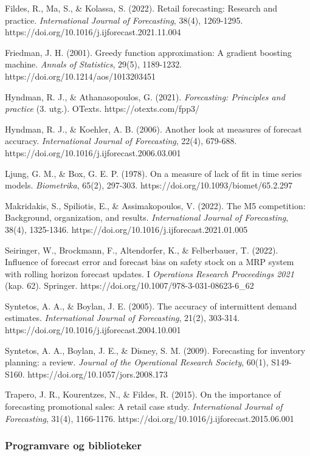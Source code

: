 \documentclass[
  norsk,
  11pt,
  a4paper,
]{article}
\begin{document}
Fildes, R., Ma, S., \& Kolassa, S. (2022). Retail forecasting: Research
and practice. \emph{International Journal of Forecasting}, 38(4),
1269-1295. https://doi.org/10.1016/j.ijforecast.2021.11.004

Friedman, J. H. (2001). Greedy function approximation: A gradient
boosting machine. \emph{Annals of Statistics}, 29(5), 1189-1232.
https://doi.org/10.1214/aos/1013203451

Hyndman, R. J., \& Athanasopoulos, G. (2021). \emph{Forecasting:
Principles and practice} (3. utg.). OTexts. https://otexts.com/fpp3/

Hyndman, R. J., \& Koehler, A. B. (2006). Another look at measures of
forecast accuracy. \emph{International Journal of Forecasting}, 22(4),
679-688. https://doi.org/10.1016/j.ijforecast.2006.03.001

Ljung, G. M., \& Box, G. E. P. (1978). On a measure of lack of fit in
time series models. \emph{Biometrika}, 65(2), 297-303.
https://doi.org/10.1093/biomet/65.2.297

Makridakis, S., Spiliotis, E., \& Assimakopoulos, V. (2022). The M5
competition: Background, organization, and results. \emph{International
Journal of Forecasting}, 38(4), 1325-1346.
https://doi.org/10.1016/j.ijforecast.2021.01.005

Seiringer, W., Brockmann, F., Altendorfer, K., \& Felberbauer, T.
(2022). Influence of forecast error and forecast bias on safety stock on
a MRP system with rolling horizon forecast updates. I \emph{Operations
Research Proceedings 2021} (kap. 62). Springer.
https://doi.org/10.1007/978-3-031-08623-6\_62

Syntetos, A. A., \& Boylan, J. E. (2005). The accuracy of intermittent
demand estimates. \emph{International Journal of Forecasting}, 21(2),
303-314. https://doi.org/10.1016/j.ijforecast.2004.10.001

Syntetos, A. A., Boylan, J. E., \& Disney, S. M. (2009). Forecasting for
inventory planning: a review. \emph{Journal of the Operational Research
Society}, 60(1), S149-S160. https://doi.org/10.1057/jors.2008.173

Trapero, J. R., Kourentzes, N., \& Fildes, R. (2015). On the importance
of forecasting promotional sales: A retail case study.
\emph{International Journal of Forecasting}, 31(4), 1166-1176.
https://doi.org/10.1016/j.ijforecast.2015.06.001

\subsubsection{Programvare og
biblioteker}\label{programvare-og-biblioteker}
\end{document}
